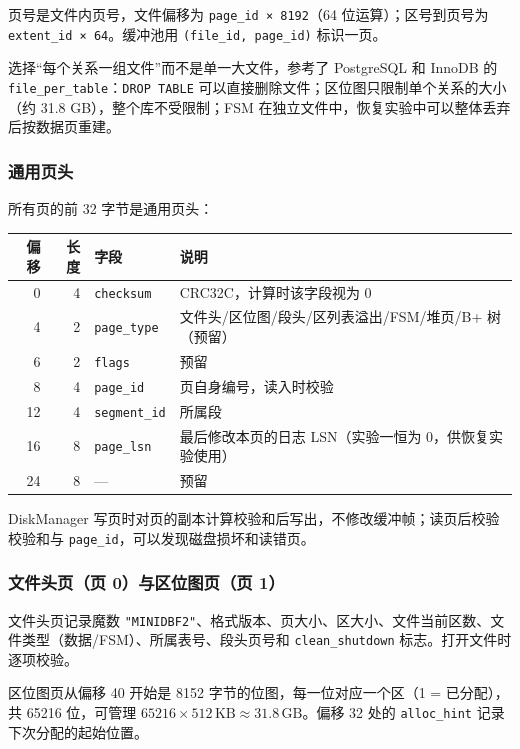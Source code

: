 \documentclass[11pt,a4paper]{ctexart}
\newcommand{\code}[1]{\texttt{#1}}
\begin{document}
页号是文件内页号，文件偏移为 \code{page\_id × 8192}（64 位运算）；区号到页号为 \code{extent\_id × 64}。缓冲池用 \code{(file\_id, page\_id)} 标识一页。

选择“每个关系一组文件”而不是单一大文件，参考了 PostgreSQL 和 InnoDB 的 \code{file\_per\_table}：\code{DROP TABLE} 可以直接删除文件；区位图只限制单个关系的大小（约 31.8 GB），整个库不受限制；FSM 在独立文件中，恢复实验中可以整体丢弃后按数据页重建。

\subsubsection{通用页头}

所有页的前 32 字节是通用页头：

\begin{table}[H]
  \centering
  \begin{tabular}{r r l l}
    \toprule
    偏移 & 长度 & 字段 & 说明 \\
    \midrule
    0 & 4 & \code{checksum} & CRC32C，计算时该字段视为 0 \\
    4 & 2 & \code{page\_type} & 文件头/区位图/段头/区列表溢出/FSM/堆页/B+ 树（预留） \\
    6 & 2 & \code{flags} & 预留 \\
    8 & 4 & \code{page\_id} & 页自身编号，读入时校验 \\
    12 & 4 & \code{segment\_id} & 所属段 \\
    16 & 8 & \code{page\_lsn} & 最后修改本页的日志 LSN（实验一恒为 0，供恢复实验使用） \\
    24 & 8 & — & 预留 \\
    \bottomrule
  \end{tabular}
\end{table}

DiskManager 写页时对页的副本计算校验和后写出，不修改缓冲帧；读页后校验校验和与 \code{page\_id}，可以发现磁盘损坏和读错页。

\subsubsection{文件头页（页 0）与区位图页（页 1）}

文件头页记录魔数 \code{"MINIDBF2"}、格式版本、页大小、区大小、文件当前区数、文件类型（数据/FSM）、所属表号、段头页号和 \code{clean\_shutdown} 标志。打开文件时逐项校验。

区位图页从偏移 40 开始是 8152 字节的位图，每一位对应一个区（1 = 已分配），共 65216 位，可管理 $65216 \times 512\,\text{KB} \approx 31.8\,\text{GB}$。偏移 32 处的 \code{alloc\_hint} 记录下次分配的起始位置。
\end{document}
